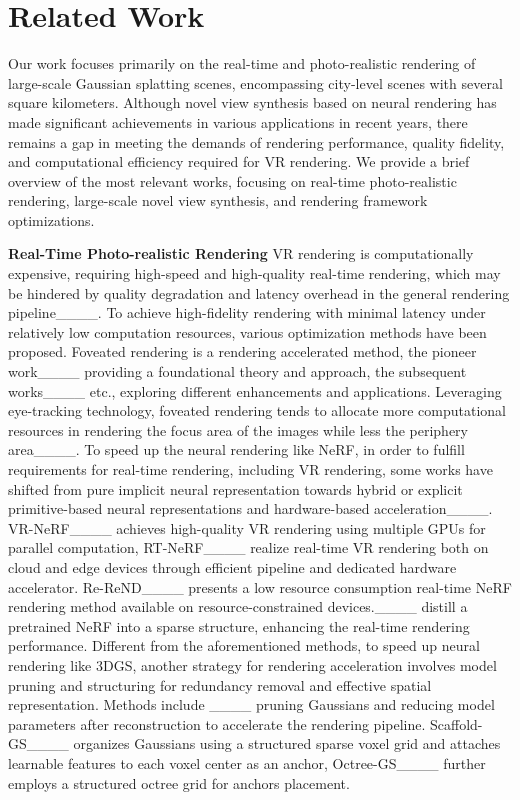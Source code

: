 \section{Related Work}

Our work focuses primarily on the real-time and photo-realistic rendering of large-scale Gaussian splatting scenes, encompassing city-level scenes with several square kilometers. Although novel view synthesis based on neural rendering has made significant achievements in various applications in recent years, there remains a gap in meeting the demands of rendering performance, quality fidelity, and computational efficiency required for VR rendering. We provide a brief overview of the most relevant works, focusing on real-time photo-realistic rendering, large-scale novel view synthesis, and rendering framework optimizations.

\textbf{Real-Time Photo-realistic Rendering} VR rendering is computationally expensive, requiring high-speed and high-quality real-time rendering, which may be hindered by quality degradation and latency overhead in the general rendering pipeline____. To achieve high-fidelity rendering with minimal latency under relatively low computation resources, various optimization methods have been proposed. Foveated rendering is a rendering accelerated method, the pioneer work____ providing a foundational theory and approach, the subsequent works____ etc., exploring different enhancements and applications. Leveraging eye-tracking technology, foveated rendering tends to allocate more computational resources in rendering the focus area of the images while less the periphery area____. 
To speed up the neural rendering like NeRF, in order to fulfill requirements for real-time rendering, including VR rendering, some works have shifted from pure implicit neural representation towards hybrid or explicit primitive-based neural representations and hardware-based acceleration____. VR-NeRF____ achieves high-quality VR rendering using multiple GPUs for parallel computation, RT-NeRF____ realize real-time VR rendering both on cloud and edge devices through efficient pipeline and dedicated hardware accelerator. Re-ReND____ presents a low resource consumption real-time NeRF rendering method available on resource-constrained devices.____ distill a pretrained NeRF into a sparse structure, enhancing the real-time rendering performance. 
Different from the aforementioned methods, to speed up neural rendering like 3DGS, another strategy for rendering acceleration involves model pruning and structuring for redundancy removal and effective spatial representation. Methods include ____ pruning Gaussians and reducing model parameters after reconstruction to accelerate the rendering pipeline. Scaffold-GS____ organizes Gaussians using a structured sparse voxel grid and attaches learnable features to each voxel center as an anchor, Octree-GS____ further employs a structured octree grid for anchors placement. 

